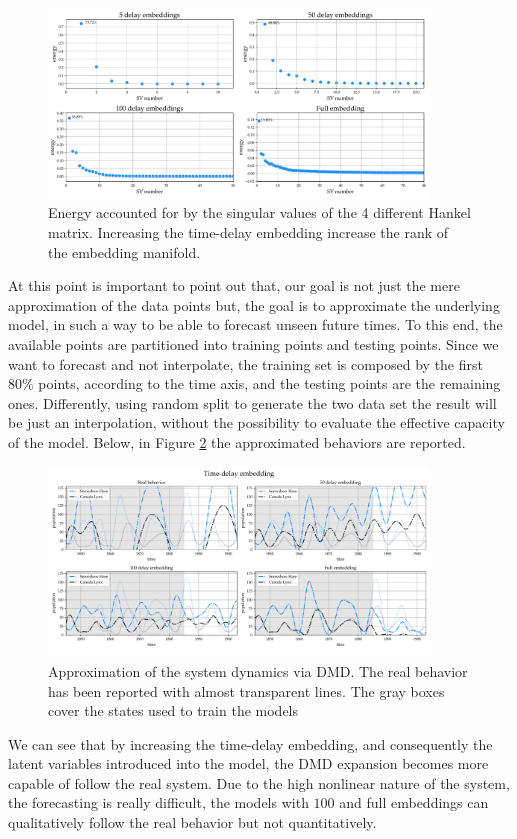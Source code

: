 \documentclass[]{article}
\begin{document}
\begin{figure}[!t]
\centering
\includegraphics[width=0.9\textwidth]{../figures/td_energy.pdf}
\caption{Energy accounted for by the singular values of the 4 different Hankel matrix. Increasing the time-delay embedding increase the rank of the embedding manifold.}
\label{fig:fig2}
\end{figure}
At this point is important to point out that, our goal is not just the mere approximation of the data points but, the goal is to approximate the underlying model, in such a way to be able to forecast unseen future times. To this end, the available points are partitioned into training points and testing points. Since we want to forecast and not interpolate, the training set is composed by the first $80\%$ points, according to the time axis, and the testing points are the remaining ones. Differently, using random split to generate the two data set the result will be just an interpolation, without the possibility to evaluate the effective capacity of the model. Below, in Figure \ref{fig:fig3} the approximated behaviors are reported.
\begin{figure}[!t]
\centering
\includegraphics[width=0.9\textwidth]{../figures/td_dmd.pdf}
\caption{Approximation of the system dynamics via DMD. The real behavior has been reported with almost transparent lines. The gray boxes cover the states used to train the models}
\label{fig:fig3}
\end{figure}
We can see that by increasing the time-delay embedding, and consequently the latent variables introduced into the model, the DMD expansion becomes more capable of follow the real system. Due to the high nonlinear nature of the system, the forecasting is really difficult, the models with $100$ and full embeddings can qualitatively follow the real behavior but not quantitatively. 
\end{document}
